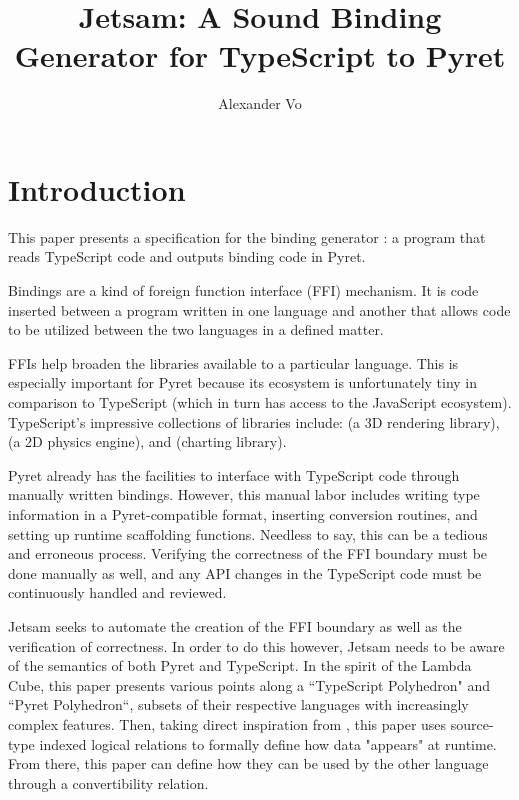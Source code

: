 \documentclass{article}
\title{Jetsam: A Sound Binding Generator for TypeScript to Pyret}
\author{Alexander Vo}
\date{}
\begin{document}
	\maketitle
	\tableofcontents
	\pagebreak
	
	\section{Introduction}
	This paper presents a specification for the binding generator \textcite{JETSAM}: a program that reads TypeScript code and outputs binding code in Pyret.
	
	Bindings are a kind of foreign function interface (FFI) mechanism. It is code inserted between a program written in one language and another that allows code to be utilized between the two languages in a defined matter.
	
	FFIs help broaden the libraries available to a particular language. This is especially important for Pyret because its ecosystem is unfortunately tiny in comparison to TypeScript (which in turn has access to the JavaScript ecosystem). TypeScript's impressive collections of libraries include: \textcite{THREEJS} (a 3D rendering library), \textcite{MATTERJS} (a 2D physics engine), and \textcite{CHARTJS} (charting library).
	
	Pyret already has the facilities to interface with TypeScript code through manually written bindings. However, this manual labor includes writing type information in a Pyret-compatible format, inserting conversion routines, and setting up runtime scaffolding functions. Needless to say, this can be a tedious and erroneous process. Verifying the correctness of the FFI boundary must be done manually as well, and any API changes in the TypeScript code must be continuously handled and reviewed.
	
	Jetsam seeks to automate the creation of the FFI boundary as well as the verification of correctness. In order to do this however, Jetsam needs to be aware of the semantics of both Pyret and TypeScript. In the spirit of the Lambda Cube, this paper presents various points along a ``TypeScript Polyhedron" and ``Pyret Polyhedron``, subsets of their respective languages with increasingly complex features. Then, taking direct inspiration from \textcite{FFI}, this paper uses source-type indexed logical relations to formally define how data "appears" at runtime. From there, this paper can define how they can be used by the other language through a convertibility relation.
	
\end{document}
